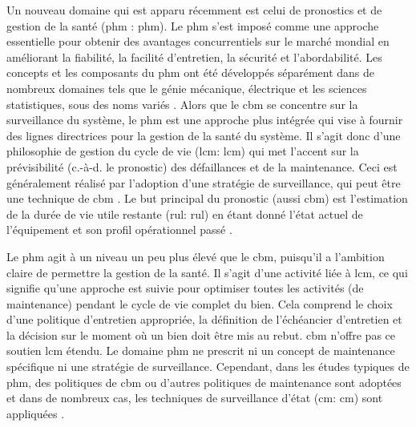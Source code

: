 Un nouveau domaine qui est apparu récemment est celui de pronostics et de gestion de la santé (\acrlong{phm} : \acrshort{phm}). Le \acrshort{phm} s’est imposé comme une approche essentielle pour obtenir des avantages concurrentiels sur le marché mondial en améliorant la fiabilité, la facilité d’entretien, la sécurité et l’abordabilité. Les concepts et les composants du \acrshort{phm} ont été développés séparément dans de nombreux domaines tels que le génie mécanique, électrique et les sciences statistiques, sous des noms variés \cite{Tsui2015}. Alors que le \acrshort{cbm} se concentre sur la surveillance du système, le \acrshort{phm} est une approche plus intégrée qui vise à fournir des lignes directrices pour la gestion de la santé du système. Il s’agit donc d’une philosophie de gestion du cycle de vie (\acrlong{lcm}: \acrshort{lcm}) qui met l’accent sur la prévisibilité (c.-à-d. le pronostic) des défaillances et de la maintenance. Ceci est généralement réalisé par l’adoption d’une stratégie de surveillance, qui peut être une technique de \acrshort{cbm} \cite{Tinga2014}. Le but principal du pronostic (aussi \acrshort{cbm}) est l'estimation de la durée de vie utile restante (\acrlong{rul}: \acrshort{rul}) en étant donné l'état actuel de l'équipement et son profil opérationnel passé \cite{Jardine2006}.

Le \acrshort{phm} agit à un niveau un peu plus élevé que le \acrshort{cbm}, puisqu’il a l’ambition claire de permettre la gestion de la santé. Il s’agit d’une activité liée à \acrshort{lcm}, ce qui signifie qu’une approche est suivie pour optimiser toutes les activités (de maintenance) pendant le cycle de vie complet du bien. Cela comprend le choix d’une politique d’entretien appropriée, la définition de l'échéancier d’entretien et la décision sur le moment où un bien doit être mis au rebut. \acrshort{cbm} n’offre pas ce soutien \acrshort{lcm} étendu. Le domaine \acrshort{phm} ne prescrit ni un concept de maintenance spécifique ni une stratégie de surveillance. Cependant, dans les études typiques de \acrshort{phm}, des politiques de \acrshort{cbm} ou d’autres politiques de maintenance sont adoptées et dans de nombreux cas, les techniques de surveillance d'état (\acrlong{cm}: \acrshort{cm}) sont appliquées \cite{Tinga2014}.



